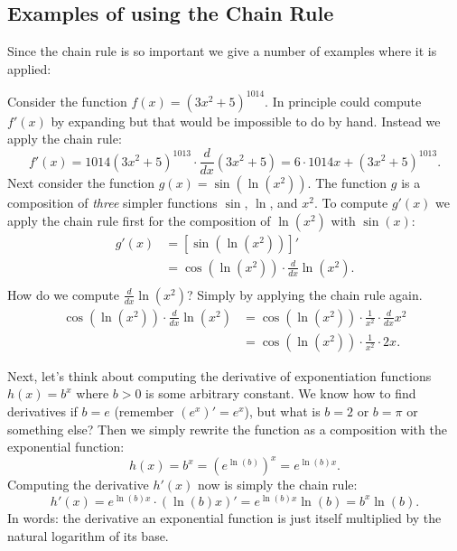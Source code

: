 \subsection{Examples of using the Chain Rule}


Since the chain rule is so important we give a number of examples where it is
applied:

\begin{bsp}
Consider the function $f(x) = (3x^2+5)^{1014}$. In principle could compute
$f'(x)$ by expanding but that would be impossible to do by hand. Instead we
apply the chain rule:
\[
f'(x) = 1014(3x^2+5)^{1013} \cdot \frac{d}{dx}(3x^2+5) = 6 \cdot 1014 x + (3x^2+5)^{1013}.
\]
Next consider the function $g(x) = \sin(\ln(x^2))$. The function $g$ is a
composition of \textit{three} simpler functions $\sin$, $\ln$, and $x^2$. To
compute $g'(x)$ we apply the chain rule first for the composition of
$\ln(x^2)$ with $\sin(x)$:
\begin{equation*}
\begin{split}
g'(x) &= [\sin(\ln(x^2))]' \\
&= \cos(\ln(x^2)) \cdot \frac{d}{dx}\ln(x^2). \\
\end{split}
\end{equation*}
How do we compute $\frac{d}{dx}\ln(x^2)$? Simply by applying the chain rule
again.
\begin{equation*}
\begin{split}
\cos(\ln(x^2)) \cdot \frac{d}{dx}\ln(x^2) &= \cos(\ln(x^2)) \cdot \frac{1}{x^2} \cdot \frac{d}{dx}x^2 \\
&= \cos(\ln(x^2)) \cdot \frac{1}{x^2} \cdot 2x.
\end{split}
\end{equation*}
\end{bsp}

\begin{bsp}
Next, let's think about computing the derivative of exponentiation functions 
$h(x) = b^x$ where $b > 0$ is some arbitrary constant. We know how to find
derivatives if $b=e$
(remember $(e^x)' = e^x$), but what is $b=2$ or $b=\pi$ or something else?
Then we simply rewrite the function as a composition with the exponential
function:
\[
h(x) = b^x = {(e^{\ln(b)})}^x = e^{\ln(b)x}.
\]
Computing the derivative $h'(x)$ now is simply the chain rule:
\[
h'(x) = e^{\ln(b)x} \cdot (\ln(b)x)' = e^{\ln(b)x}\ln(b) = b^x\ln(b).
\]
In words: the derivative an exponential function is just itself multiplied by
the natural logarithm of its base. 
\end{bsp}


